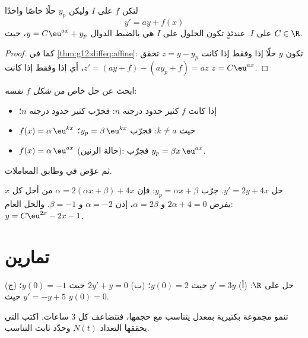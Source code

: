 \begin{proposition}\label{prop:g12:diffeq:general}
لتكن $f$  على  $I$ وليكن $y_p$ حلًا خاصًا واحدًا
\[
y' = ay + f(x)
\]
على $I$. عندئذٍ تكون الحلول على $I$ هي بالضبط الدوال
$y = C\eu^{ax} + y_p$، حيث $C \in \R$.
\end{proposition}

\begin{proof}
كما في \cref{thm:g12:diffeq:affine}: تكون $y$ حلًا إذا وفقط إذا كانت
$z = y - y_p$ تحقق
$z' = (ay + f) - (ay_p + f) = az$، أي إذا وفقط إذا كانت $z = C\eu^{ax}$.
\end{proof}

\begin{method}\label{met:g12:diffeq:particular}
ابحث عن حل خاص \emph{من شكل $f$ نفسه}:
\begin{itemize}
  \item إذا كانت $f$ كثير حدود درجته $n$: فجرّب كثير حدود درجته $n$؛
  \item $f(x) = \alpha\,\eu^{kx}$ حيث $k \neq a$: فجرّب $y_p = \beta\,\eu^{kx}$؛
  \item $f(x) = \alpha\,\eu^{ax}$ (حالة الرنين): فجرّب
        $y_p = \beta x\,\eu^{ax}$.
\end{itemize}
ثم عوّض في  وطابق المعاملات.
\end{method}

\begin{example}\label{ex:g12:diffeq:particular}
حل $y' = 2y + 4x$. جرّب $y_p = \alpha x + \beta$:
فإن $\alpha = 2(\alpha x + \beta) + 4x$ من أجل كل $x$ يفرض
$2\alpha + 4 = 0$ و $\alpha = 2\beta$، إذن $\alpha = -2$ و $\beta = -1$.
والحل العام: $y = C\eu^{2x} - 2x - 1$.
\end{example}

\section{تمارين}

\begin{exercise}[$\star$]\label{exo:g12:diffeq:1}
حل على $\R$:
(أ) $y' = 3y$ حيث $y(0) = 2$؛\quad
(ب) $2y' + y = 0$ حيث $y(0) = -1$؛\quad
(ج) $y' = -y + 5$ حيث $y(0) = 0$.
\end{exercise}

\begin{exercise}[$\star$]\label{exo:g12:diffeq:2}
تنمو مجموعة بكتيرية بمعدل يتناسب مع حجمها، فتتضاعف
كل $3$ ساعات. اكتب  التي يحققها التعداد
$N(t)$ وحدّد ثابت التناسب.
\end{exercise}

